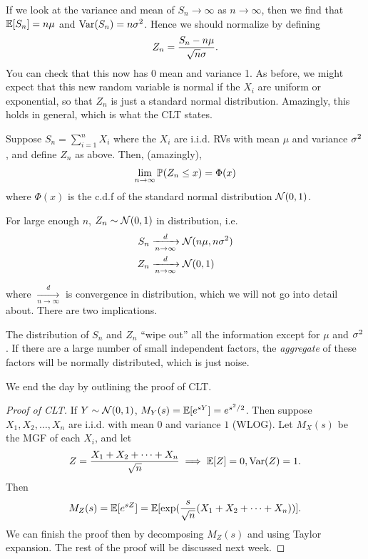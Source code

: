 \documentclass[11 pt]{scrartcl}
\begin{document}
    If we look at the variance and mean of $S_n\to \infty$ as $n\to\infty$, then we find that $\mathbb E[S_n] = n\mu$ and $\text{Var}(S_n) = n\sigma^2$. Hence we should normalize by defining 
\[ Z_n = \dfrac{S_n - n\mu}{\sqrt{n}\sigma}.\] 
You can check that this now has 0 mean and variance 1. As before, we might expect that this new random variable is normal if the $X_i$ are uniform or exponential, so that $Z_n$ is just a standard normal distribution. Amazingly, this holds in general, which is what the CLT states. 

\begin{theorem}
    Suppose $S_n = \sum_{i=1}^n X_i$ where the $X_i$ are i.i.d. RVs with mean $\mu$ and variance $\sigma^2$, and define $Z_n$ as above. Then, (amazingly), 
    \[ \lim_{n\to\infty} \mathbb P(Z_n\leq x) = \Phi(x) \] 
    where $\Phi(x)$ is the c.d.f of the standard normal distribution $\mathcal{N}(0, 1)$. 
\end{theorem}

For large enough $n$, $Z_n\sim\mathcal{N}(0,1)$ in distribution, i.e. 
\begin{align*}
    S_n &\xrightarrow[n\to\infty]{d} \mathcal{N}(n\mu, n\sigma^2) \\
    Z_n &\xrightarrow[n\to\infty]{d} \mathcal{N}(0, 1) 
\end{align*}

where $\xrightarrow[n\to\infty]{d}$ is convergence in distribution, which we will not go into detail about. There are two implications. 
\begin{enumerate}
    \ii The distribution of $S_n$ and $Z_n$ ``wipe out'' all the information except for $\mu$ and $\sigma^2$. 
    \ii If there are a large number of small independent factors, the \emph{aggregate} of these factors will be normally distributed, which is just noise. 
\end{enumerate}

We end the day by outlining the proof of CLT. 
\begin{proof}[Proof of CLT]
    If $Y\sim \mathcal{N}(0,1)$, $M_Y(s) = \mathbb E[e^{sY}] = e^{s^2/2}$. Then suppose $X_1, X_2, \dots, X_n$ are i.i.d. with mean $0$ and variance $1$ (WLOG). Let $M_X(s)$ be the MGF of each $X_i$, and let 
    \[ Z = \dfrac{X_1 + X_2 + \dots + X_n}{\sqrt{n}} \implies \mathbb E[Z] = 0, \text{Var}(Z) = 1.\] 
    Then 
    \[ M_Z(s) = \mathbb E[e^{sZ}] = \mathbb E[\exp(\frac{s}{\sqrt{n}}(X_1 + X_2 + \dots + X_n))].\] 
    We can finish the proof then by decomposing $M_Z(s)$ and using Taylor expansion. The rest of the proof will be discussed next week. 
\end{proof}
\end{document}
